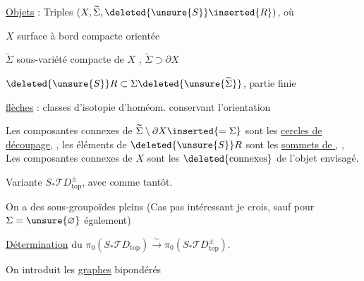 \uline{Objets} : Triples $(X,\widetilde\Sigma,
\deleted{\unsure{S}}\inserted{R})$, où

$X$ surface à bord compacte orientée

$\widetilde\Sigma$ sous-variété compacte de $X$
, $\widetilde\Sigma\supset\partial X$

$\deleted{\unsure{S}}R\subset\Sigma\deleted{\unsure{\widetilde\Sigma}}$,
partie finie


\uline{flèches} : classes d'isotopie d'homéom. conservant l'orientation

Les composantes connexes de $\widetilde\Sigma\setminus\partial X
\inserted{=\Sigma}$ sont les \uline{cercles de découpage},
,
les éléments de $\deleted{\unsure{S}}R$ sont les
 \uline{sommets de
},
,
Les composantes connexes de $X$ sont les
$\deleted{\text{connexes}}$
de l'objet envisagé.

Variante $S_*\mathcal TD_{\mathrm{top}}^\pm$, avec
comme tantôt.

On a des sous-groupoïdes pleins
(Cas pas intéressant je crois, sauf pour $\Sigma=\unsure{\varnothing}$
également)


 \uline{Détermination} du
$\pi_0(S_*\mathcal TD_{\mathrm{top}})
 \xrightarrow{\sim}\pi_0(S_*\mathcal TD^\pm_{\mathrm{top}})$.

On introduit les \uline{graphes}  bipondérés
